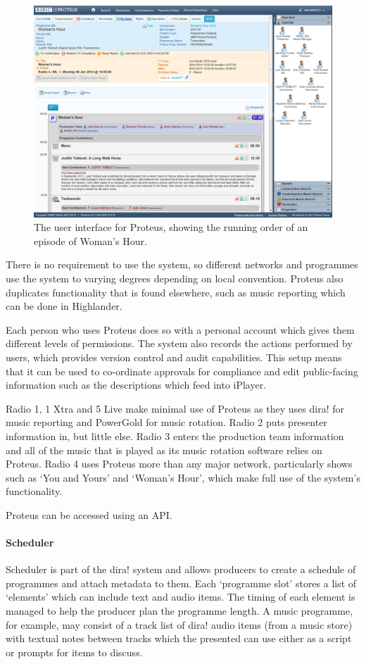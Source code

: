 \begin{figure}[p]
\centering
\includegraphics[width=\textwidth]{figs/proteus.png}
\caption{The user interface for Proteus, showing the running order of an
  episode of Woman's Hour.}
\label{fig:proteus}
\end{figure}

There is no requirement to use the system, so different networks and programmes
use the system to varying degrees depending on local convention. Proteus also
duplicates functionality that is found elsewhere, such as music reporting which
can be done in Highlander. 

Each person who uses Proteus does so with a personal account which gives them
different levels of permissions. The system also records the actions performed
by users, which provides version control and audit capabilities. This setup
means that it can be used to co-ordinate approvals for compliance and edit
public-facing information such as the descriptions which feed into iPlayer.

Radio 1, 1 Xtra and 5 Live make minimal use of Proteus as they uses dira! for
music reporting and PowerGold for music rotation. Radio 2 puts presenter
information in, but little else. Radio 3 enters the production team information
and all of the music that is played as its music rotation software relies on
Proteus. Radio 4 uses Proteus more than any major network, particularly shows
such as `You and Yours' and `Woman's Hour', which make full use of the system's
functionality. 

Proteus can be accessed using an API.

\paragraph{Scheduler}
Scheduler is part of the dira! system and allows producers to create a schedule
of programmes and attach metadata to them. Each `programme slot' stores a list
of `elements' which can include text and audio items. The timing of each
element is managed to help the producer plan the programme length. A music
programme, for example, may consist of a track list of dira! audio items (from
a music store) with textual notes between tracks which the presented can use
either as a script or prompts for items to discuss. 

